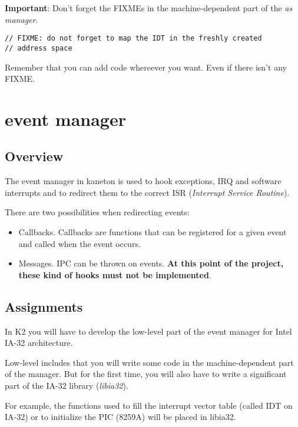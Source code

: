 \textbf{Important}: Don't forget the FIXMEs in the machine-dependent
part of the \textit{as manager}.

\begin{verbatim}
// FIXME: do not forget to map the IDT in the freshly created
// address space
\end{verbatim}

Remember that you can add code whereever you want. Even if there isn't any FIXME.

%
%

\newpage

\section{event manager}

\subsection* {Overview}

The event manager in kaneton is used to hook exceptions, IRQ and
software interrupts and to redirect them to the correct ISR
(\emph{Interrupt Service Routine}).

There are two possibilities when redirecting events:
\begin{itemize}
\item
  Callbacks. Callbacks are functions that can be registered for
  a given event and called when the event occurs.
\item
  Messages. IPC can be thrown on events. \textbf{At this point
    of the project, these kind of hooks must not be implemented}.
\end{itemize}

\subsection* {Assignments}

In K2 you will have to develop the low-level part of the event
manager for Intel IA-32 architecture.

Low-level includes that you will write some code in the
machine-dependent part of the manager. But for the first time, you
will also have to write a significant part of the IA-32 library
(\emph{libia32}).

For example, the functions used to fill the interrupt vector table
(called IDT on IA-32) or to initialize the PIC (8259A) will be placed in
libia32.

